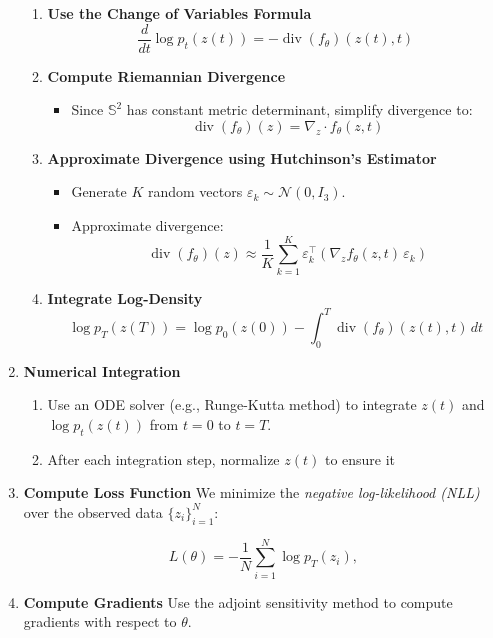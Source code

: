 \documentclass[a4paper,14pt]{article}
\renewcommand{\epsilon}{\ensuremath{\varepsilon}}
\theoremstyle{plain} %
\theoremstyle{definition} %
\theoremstyle{remark} %
\begin{document}
\begin{enumerate}
\begin{enumerate}
			\item \textbf{Use the Change of Variables Formula}
			\[
			\frac{d}{dt} \log p_t(z(t)) = -\operatorname{div}(f_\theta)(z(t), t)
			\]
			\item \textbf{Compute Riemannian Divergence}
			\begin{itemize}
				\item Since \(\mathbb{S}^2\) has constant metric determinant, simplify divergence to:
				\[
				\operatorname{div}(f_\theta)(z) = \nabla_z \cdot f_\theta(z, t)
				\]
			\end{itemize}
			\item \textbf{Approximate Divergence using Hutchinson's Estimator}
			\begin{itemize}
				\item Generate \( K \) random vectors \( \epsilon_k \sim \mathcal{N}(0, I_3) \).
				\item Approximate divergence:
				\[
				\operatorname{div}(f_\theta)(z) \approx \frac{1}{K} \sum_{k=1}^K \epsilon_k^\top \left( \nabla_z f_\theta(z, t) \, \epsilon_k \right)
				\]
			\end{itemize}
			\item \textbf{Integrate Log-Density}
			\[
			\log p_T(z(T)) = \log p_0(z(0)) - \int_0^T \operatorname{div}(f_\theta)(z(t), t) \, dt
			\]
		\end{enumerate}
		
		\item \textbf{Numerical Integration}
		\begin{enumerate}
			\item Use an ODE solver (e.g., Runge-Kutta method) to integrate \( z(t) \) and \( \log p_t(z(t)) \) from \( t = 0 \) to \( t = T \).
			\item After each integration step, normalize \( z(t) \) to ensure it 
		\end{enumerate}
		
		\item \textbf{Compute Loss Function}
		We minimize the \textit{negative log-likelihood (NLL)} over the observed data \(\{ z_i \}_{i=1}^N\):
		
		\begin{equation}
			L(\theta) = -\frac{1}{N} \sum_{i=1}^N \log p_T(z_i),
		\end{equation}
		
		\item \textbf{Compute Gradients}
		Use the adjoint sensitivity method to compute gradients with respect to \( \theta \).
		

\end{enumerate}
\end{document}
